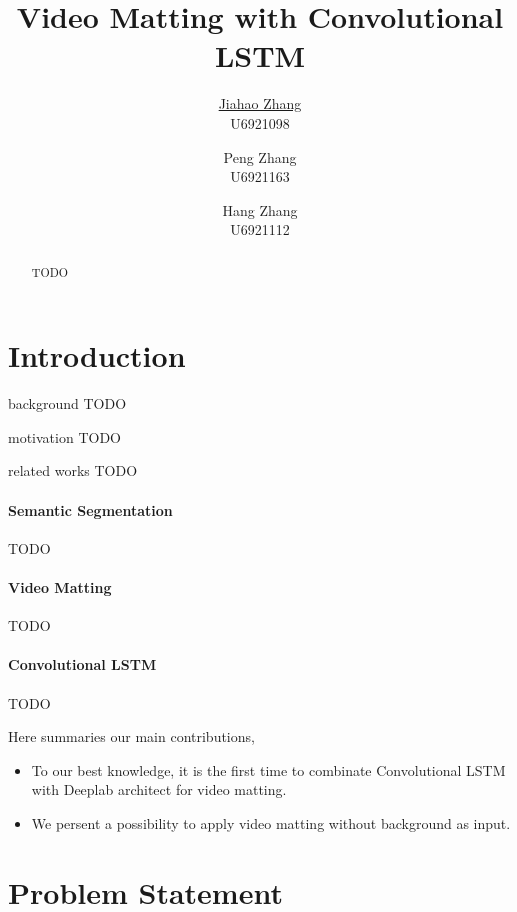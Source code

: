 \documentclass[final]{cvpr}
\begin{document}
\title{Video Matting with Convolutional LSTM}
\author{\underline{Jiahao Zhang} \\ U6921098 \and Peng Zhang \\ U6921163 \and Hang Zhang \\ U6921112}

\maketitle
\begin{abstract}
    TODO
\end{abstract}


\section{Introduction}

background TODO

motivation TODO

related works TODO

\paragraph{Semantic Segmentation}

TODO

\paragraph{Video Matting}

TODO

\paragraph{Convolutional LSTM}

TODO

Here summaries our main contributions,

\begin{itemize}
    \item To our best knowledge, it is the first time to combinate Convolutional LSTM with Deeplab architect for video matting.
    \item We persent a possibility to apply video matting without background as input.
\end{itemize}

\section{Problem Statement}
\end{document}

